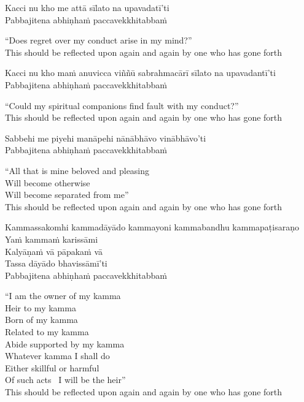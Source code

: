 Kacci nu kho me attā sīlato na upavadatī'ti\\
Pabbajitena abhiṇhaṁ paccavekkhitabbaṁ

\begin{english}
  “Does regret over my conduct arise in my mind?”\\
  This should be reflected upon again and again by one who has gone forth
\end{english}

Kacci nu kho maṁ anuvicca viññū sabrahmacārī sīlato na upavadantī'ti\\
Pabbajitena abhiṇhaṁ paccavekkhitabbaṁ

\begin{english}
  “Could my spiritual companions find fault with my conduct?”\\
  This should be reflected upon again and again by one who has gone forth
\end{english}

Sabbehi me piyehi manāpehi nānābhāvo vinābhāvo'ti\\
Pabbajitena abhiṇhaṁ paccavekkhitabbaṁ

\begin{english}
  “All that is mine beloved and pleasing\\
  Will become otherwise\\
  Will become separated from me”\\
  This should be reflected upon again and again by one who has gone forth
\end{english}

Kammassakomhi kammadāyādo kammayoni kammabandhu kammapaṭisaraṇo\\
Yaṁ kammaṁ karissāmi\\
Kalyāṇaṁ vā pāpakaṁ vā\\
Tassa dāyādo bhavissāmī'ti\\
Pabbajitena abhiṇhaṁ paccavekkhitabbaṁ

\begin{english}
  “I am the owner of my kamma\\
  Heir to my kamma\\
  Born of my kamma\\
  Related to my kamma\\
  Abide supported by my kamma\\
  Whatever kamma I shall do\\
  Either skillful or harmful\\
  Of such acts \breathmark\ I will be the heir”\\
  This should be reflected upon again and again by one who has gone forth
\end{english}

